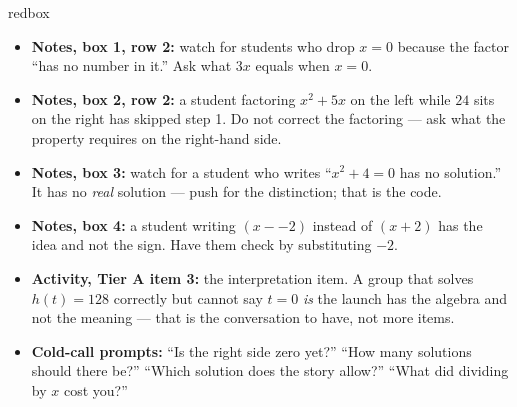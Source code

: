 \documentclass[10pt]{article}
\begin{document}
\begin{skillbox}{redbox}
\begin{itemize}[leftmargin=1.2em, itemsep=2pt, topsep=2pt]
  \item \textbf{Notes, box 1, row 2:} watch for students who drop $x=0$ because the factor ``has no
        number in it.'' Ask what $3x$ equals when $x=0$.
  \item \textbf{Notes, box 2, row 2:} a student factoring $x^2+5x$ on the left while $24$ sits on
        the right has skipped step 1. Do not correct the factoring --- ask what the property
        requires on the right-hand side.
  \item \textbf{Notes, box 3:} watch for a student who writes ``$x^2+4=0$ has no solution.'' It has
        no \emph{real} solution --- push for the distinction; that is the code.
  \item \textbf{Notes, box 4:} a student writing $(x-{-2})$ instead of $(x+2)$ has the idea and not
        the sign. Have them check by substituting $-2$.
  \item \textbf{Activity, Tier A item 3:} the interpretation item. A group that solves $h(t)=128$
        correctly but cannot say $t=0$ \emph{is} the launch has the algebra and not the meaning ---
        that is the conversation to have, not more items.
  \item \textbf{Cold-call prompts:} ``Is the right side zero yet?'' ``How many solutions should
        there be?'' ``Which solution does the story allow?'' ``What did dividing by $x$ cost you?''
\end{itemize}
\end{skillbox}
\end{document}
